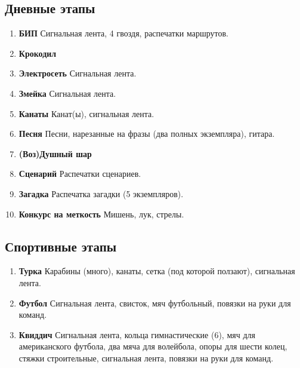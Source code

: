 
\subsection*{Дневные этапы}
	\begin{enumerate}
	\item \textbf{БИП} Сигнальная лента, 4 гвоздя, распечатки маршрутов.
	\item \textbf{Крокодил}
	\item \textbf{Электросеть} Сигнальная лента.
	\item \textbf{Змейка} Сигнальная лента.
	\item \textbf{Канаты} Канат(ы), сигнальная лента.
	\item \textbf{Песня} Песни, нарезанные на фразы (два полных экземпляра), гитара.
	\item \textbf{(Воз)Душный шар}
	\item \textbf{Сценарий} Распечатки сценариев.
	\item \textbf{Загадка} Распечатка загадки (5 экземпляров).
	\item \textbf{Конкурс на меткость} Мишень, лук, стрелы.
	\end{enumerate}
	
\subsection*{Спортивные этапы}
	\begin{enumerate}
	\item \textbf{Турка} Карабины (много), канаты, сетка (под которой ползают), сигнальная лента.
	\item \textbf{Футбол} Сигнальная лента, свисток, мяч футбольный, повязки на руки для команд.
	\item \textbf{Квиддич} Сигнальная лента, кольца гимнастические (6), мяч для американского футбола, два мяча для волейбола, опоры для шести колец, стяжки строительные, сигнальная лента, повязки на руки для команд.
	\end{enumerate}
	
